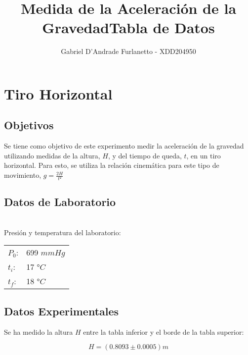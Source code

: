 \documentclass[a4paper,12pt]{article}
\begin{document}
\title{Medida de la Aceleración de la Gravedad}

\author{Gabriel D'Andrade Furlanetto - XDD204950}
\date{}
\maketitle
\pagebreak
\section{Tiro Horizontal}
\subsection{Objetivos}
Se tiene como objetivo de este experimento medir la aceleración de la gravedad utilizando medidas
de la altura, $H$, y del tiempo de queda, $t$, en un tiro horizontal. Para esto, se utiliza la
relación cinemática para este tipo de movimiento, $g =\frac{2H}{t²}$
\subsection{Datos de Laboratorio}
\begin{table}[h!]
\centering
\title{\textbf{Tabla de Datos}}
\\Presión y temperatura del laboratorio:


\begin{tabular}{|ll|}
\hline
$P_0$: & 699 $mmHg$ \\
$t_i$: & 17 °$C$ \\
$t_f$: & 18 °$C$ \\
\hline
\end{tabular}
\end{table}
\subsection{Datos Experimentales}
Se ha medido la altura $H$ entre la tabla inferior y el borde de la tabla superior:

\begin{tcolorbox}
\begin{equation}
  H = (0.8093 \pm 0.0005)m
\end{equation}
\end{tcolorbox}
\end{document}
